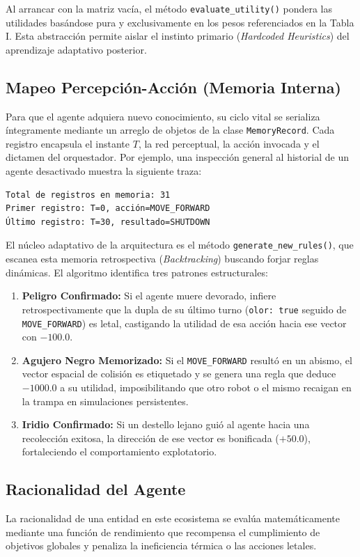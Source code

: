 \documentclass[conference]{IEEEtran}
\begin{document}
Al arrancar con la matriz vacía, el método \texttt{evaluate\_utility()} pondera las utilidades basándose pura y exclusivamente en los pesos referenciados en la Tabla I. Esta abstracción permite aislar el instinto primario (\textit{Hardcoded Heuristics}) del aprendizaje adaptativo posterior.

\subsection{Mapeo Percepción-Acción (Memoria Interna)}
Para que el agente adquiera nuevo conocimiento, su ciclo vital se serializa íntegramente mediante un arreglo de objetos de la clase \texttt{MemoryRecord}. Cada registro encapsula el instante $T$, la red perceptual, la acción invocada y el dictamen del orquestador. Por ejemplo, una inspección general al historial de un agente desactivado muestra la siguiente traza:

\begin{verbatim}
Total de registros en memoria: 31
Primer registro: T=0, acción=MOVE_FORWARD
Último registro: T=30, resultado=SHUTDOWN
\end{verbatim}

El núcleo adaptativo de la arquitectura es el método \texttt{generate\_new\_rules()}, que escanea esta memoria retrospectiva (\textit{Backtracking}) buscando forjar reglas dinámicas. El algoritmo identifica tres patrones estructurales:

\begin{enumerate}
    \item \textbf{Peligro Confirmado:} Si el agente muere devorado, infiere retrospectivamente que la dupla de su último turno (\texttt{olor: true} seguido de \texttt{MOVE\_FORWARD}) es letal, castigando la utilidad de esa acción hacia ese vector con $-100.0$.
    \item \textbf{Agujero Negro Memorizado:} Si el \texttt{MOVE\_FORWARD} resultó en un abismo, el vector espacial de colisión es etiquetado y se genera una regla que deduce $-1000.0$ a su utilidad, imposibilitando que otro robot o el mismo recaigan en la trampa en simulaciones persistentes.
    \item \textbf{Iridio Confirmado:} Si un destello lejano guió al agente hacia una recolección exitosa, la dirección de ese vector es bonificada ($+50.0$), fortaleciendo el comportamiento explotatorio.
\end{enumerate}

\subsection{Racionalidad del Agente}
La racionalidad de una entidad en este ecosistema se evalúa matemáticamente mediante una función de rendimiento que recompensa el cumplimiento de objetivos globales y penaliza la ineficiencia térmica o las acciones letales. 
\end{document}
